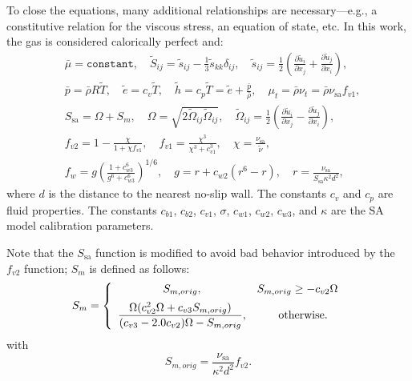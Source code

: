 \documentclass[10pt]{article}
\newcommand{\pp}[2]{\frac{\partial #1}{\partial #2}}
\newcommand{\sa}{\nu_{\mathrm{sa}}}
\begin{document}
To close the equations, many additional relationships are
necessary---e.g., a constitutive relation for the viscous stress, an
equation of state, etc. In this work, the gas is considered calorically perfect and:
%
\begin{equation}
 \begin{split}\label{eq:closure}
&\bar{\mu} =\texttt{constant}, \quad \tilde{S}_{ij} = \tilde{s}_{ij} - \frac{1}{3} \tilde{s}_{kk} \delta_{ij}, \quad \tilde{s}_{ij} = \frac{1}{2} \left( \pp{\tilde{u}_i}{x_j} + \pp{\tilde{u}_j}{x_i} \right), \\
&\bar{p} = \bar{\rho} R \tilde{T}, \quad \tilde{e} = c_v \tilde{T}, \quad \tilde{h} = c_p \tilde{T} = \tilde{e} + \frac{\bar{p}}{\bar{\rho}}, \quad\mu_t = \bar{\rho} \nu_t = \bar{\rho} \sa f_{v1}, \\
& S_{\mathrm{sa}} = \Omega + S_m, \quad \Omega = \sqrt{2 \tilde{\Omega}_{ij} \tilde{\Omega}_{ij} }, \quad \widetilde{\Omega}_{ij} = \frac{1}{2} \left( \pp{\tilde{u}_i}{x_j} - \pp{\tilde{u}_j}{x_i} \right), \\
&f_{v2} = 1 - \frac{\chi}{1 + \chi f_{v1}}, \quad f_{v1} = \frac{\chi^3}{\chi^3 + c_{v1}^3}, \quad \chi = \frac{\sa}{\tilde{\nu}}, \\
&f_w = g \left( \frac{1 + c_{w3}^6}{g^6 + c_{w3}^6} \right)^{1/6}, \quad g = r + c_{w2} \left( r^6 - r \right), \quad r = \frac{\sa}{S_{\mathrm{sa}} \kappa^2 d^2}, 
 \end{split}
\end{equation}
%
where $d$ is the distance to the nearest no-slip wall. The constants $c_v$ and $c_p$ are fluid properties.  The constants $c_{b1}$, $c_{b2}$, $c_{v1}$, $\sigma$,
$c_{w1}$, $c_{w2}$, $c_{w3}$, and $\kappa$ are the SA model calibration parameters.

Note that the $S_{\mathrm{sa}}$ function is
modified to avoid bad behavior introduced by the $f_{v2}$ function; $S_m$ is defined as follows:
\begin{equation*}
S_m = \left\{ \begin{array}{cc}
S_{m, orig}, & S_{m,orig} \geq -c_{v2} \Omega \vspace{5pt}\\ 
\dfrac{\Omega (c_{v2}^2 \Omega + c_{v3} S_{m,orig})}{ (c_{v3}-2.0c_{v2}) \Omega - S_{m,orig}}, & \quad \mathrm{otherwise}.
\end{array}
\right.
\end{equation*}
with 
\begin{equation*}
S_{m, orig} = \frac{\sa}{\kappa^2 d^2} f_{v2}.
\end{equation*}
\end{document}
